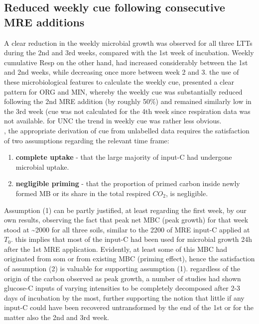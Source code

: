 	\subsection{Reduced weekly \gls{cue} following consecutive MRE additions}

	A clear reduction in the weekly microbial growth was observed for all three LTTs during the 2nd and 3rd weeks, compared with the 1st week of incubation.
	Weekly cumulative Resp on the other hand, had increased considerably between the 1st and 2nd weeks, while decreasing once more between week 2 and 3.
	the use of these microbiological features to calculate the weekly \gls{cue}, presented a clear pattern for ORG and MIN, whereby the weekly \gls{cue} was substantially reduced following the 2nd MRE addition (by roughly 50\%) and remained similarly low in the 3rd week (\gls{cue} was not calculated for the 4th week since respiration data was not available. for UNC the trend in weekly \gls{cue} was rather less obvious.\\
	, the appropriate derivation of \gls{cue} from unlabelled data requires the satisfaction of two assumptions regarding the relevant time frame:
	\begin{enumerate}
		\item \label{item: complete_uptake}\textbf{complete uptake} - that the large majority of input-C had undergone microbial uptake.
		\item \label{item: negligible_priming}\textbf{negligible priming} - that the proportion of primed carbon inside newly formed MB or its share in the total respired $ CO_2 $, is negligible.
	\end{enumerate}
	Assumption (1) can be partly justified, at least regarding the first week, by  our own results,  observing the fact that peak net MBC (peak growth) for that week stood at \~{}2000 \genericunit for all three soils, similar to the 2200 \genericunit of MRE input-C applied at $ T_0 $. this implies that most of the  input-C had been used for microbial growth 24h after the 1st MRE application. Evidently, at least some of this MBC had originated from \gls{som} or from existing MBC (priming effect), hence the satisfaction of assumption (2) is valuable for supporting assumption (1). regardless of the origin of the carbon observed as peak growth, a  number of studies had shown glucose-C inputs of varying intensities to be completely decomposed after 2-3 days of incubation by the most\citep{hill2008, landi2006}, further supporting the notion that little if any input-C could have been recovered untransformed by the end of the 1st or for the matter also the 2nd and 3rd week.
